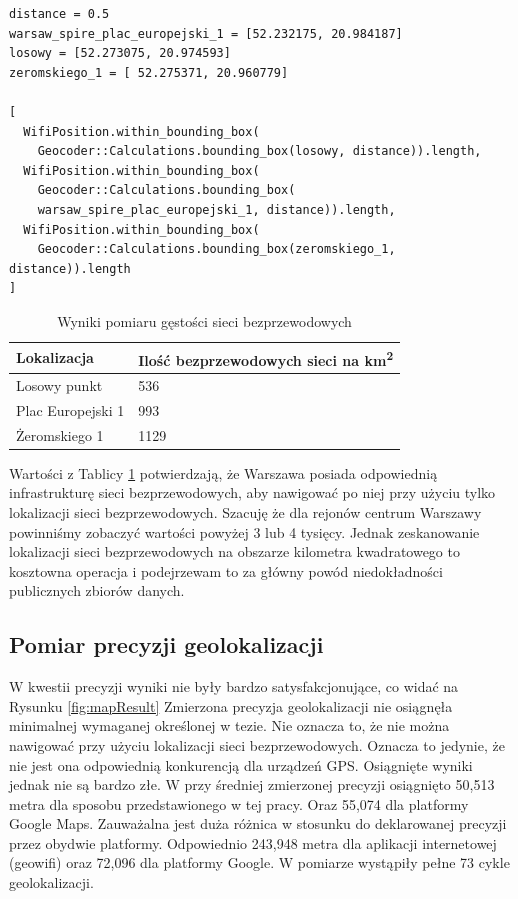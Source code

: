 \begin{verbatim}
distance = 0.5
warsaw_spire_plac_europejski_1 = [52.232175, 20.984187]
losowy = [52.273075, 20.974593]
zeromskiego_1 = [ 52.275371, 20.960779]

[
  WifiPosition.within_bounding_box(
    Geocoder::Calculations.bounding_box(losowy, distance)).length,
  WifiPosition.within_bounding_box(
    Geocoder::Calculations.bounding_box(
    warsaw_spire_plac_europejski_1, distance)).length,
  WifiPosition.within_bounding_box(
    Geocoder::Calculations.bounding_box(zeromskiego_1, distance)).length
]
\end{verbatim}

\begin{table}
\caption{Wyniki pomiaru gęstości sieci bezprzewodowych}
\label{table:densityResult}
\begin{tabular} { |l|l|  }
\hline
Lokalizacja & Ilość bezprzewodowych sieci na km\textsuperscript{2} \\
\hline
\hline
Losowy punkt & 536 \\
Plac Europejski 1 & 993 \\
Żeromskiego 1 & 1129 \\
\hline
\end{tabular}
\end{table}

Wartości z Tablicy \ref{table:densityResult} potwierdzają, że Warszawa posiada odpowiednią infrastrukturę sieci bezprzewodowych, aby nawigować po niej przy użyciu tylko lokalizacji sieci bezprzewodowych. Szacuję że dla rejonów centrum Warszawy powinniśmy zobaczyć wartości powyżej 3 lub 4 tysięcy. Jednak zeskanowanie lokalizacji sieci bezprzewodowych na obszarze kilometra kwadratowego to kosztowna operacja i podejrzewam to za główny powód niedokładności publicznych zbiorów danych.

\subsection{Pomiar precyzji geolokalizacji}
W kwestii precyzji wyniki nie były bardzo satysfakcjonujące, co widać na Rysunku \ref{fig:mapResult} Zmierzona precyzja geolokalizacji nie osiągnęła minimalnej wymaganej określonej w tezie. Nie oznacza to, że nie można nawigować przy użyciu lokalizacji sieci bezprzewodowych. Oznacza to jedynie, że nie jest ona odpowiednią konkurencją dla urządzeń GPS. Osiągnięte wyniki jednak nie są bardzo złe. W przy średniej zmierzonej precyzji osiągnięto 50,513 metra dla sposobu przedstawionego w tej pracy. Oraz 55,074 dla platformy Google Maps. Zauważalna jest duża różnica w stosunku do deklarowanej precyzji przez obydwie platformy. Odpowiednio 243,948 metra dla aplikacji internetowej (geowifi) oraz 72,096 dla platformy Google. W pomiarze wystąpiły pełne 73 cykle geolokalizacji.

